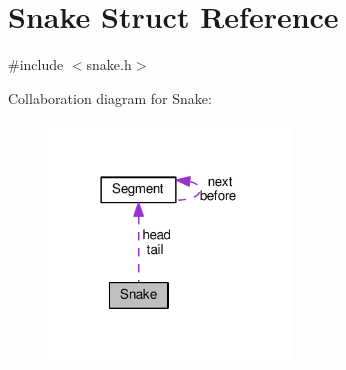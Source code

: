 \hypertarget{structSnake}{}\section{Snake Struct Reference}
\label{structSnake}


{\ttfamily \#include $<$snake.\+h$>$}



Collaboration diagram for Snake\+:
\nopagebreak
\begin{figure}[H]
\begin{center}
\leavevmode
\includegraphics[width=182pt]{structSnake__coll__graph}
\end{center}
\end{figure}
